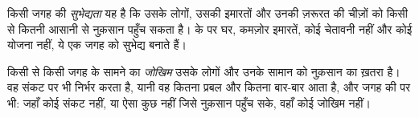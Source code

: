 \begin{definition}[सुभेद्यता]\label{def:g9:natural-risks:vulnerability}
किसी जगह की \emph{सुभेद्यता} यह है कि उसके लोगों, उसकी इमारतों
और उनकी ज़रूरत की चीज़ों को किसी  से कितनी आसानी से नुक़सान पहुँच सकता है।
 के  पर घर, कमज़ोर इमारतें, कोई चेतावनी नहीं और कोई योजना नहीं, ये एक जगह को
सुभेद्य बनाते हैं।
\end{definition}

\begin{definition}[जोखिम]\label{def:g9:natural-risks:risk}
किसी  से किसी जगह के सामने का \emph{जोखिम} उसके लोगों
और उनके सामान को नुक़सान का ख़तरा है। वह संकट पर भी निर्भर करता है, यानी वह कितना प्रबल
और कितना बार-बार आता है, और जगह की  पर भी: जहाँ कोई संकट नहीं, या ऐसा कुछ नहीं
जिसे नुक़सान पहुँच सके, वहाँ कोई जोखिम
नहीं।
\end{definition}

